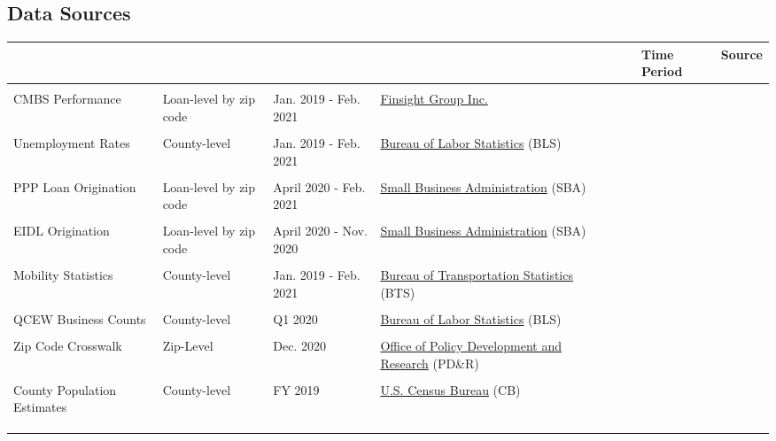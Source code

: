 \documentclass[11pt]{article} %
\begin{document}
\subsection{Data Sources }
\begin{table}[H]
\label{This is a label}
\resizebox{\textwidth}{!} {
\begin{tabular}{llll} \toprule & & & & \vspace{0.5em}
\textbf{\large{}} & \textbf{\large{}} & \textbf{\large{Time Period}} & \textbf{\large{Source}}  
\\\midrule \midrule
 & & & & &  \\
 
 CMBS Performance & Loan-level by zip code & Jan. 2019 - Feb. 2021 & \href{https://finsight.com/}{Finsight Group Inc.} & \\\\

Unemployment Rates & County-level & Jan. 2019 - Feb. 2021 & \href{https://www.bls.gov/}{Bureau of Labor Statistics} (BLS) & \\\\

PPP Loan Origination & Loan-level by zip code & April 2020 - Feb. 2021 \hspace{0.3em} & \href{https://www.sba.gov/}{Small Business Administration} (SBA) & \\\\

EIDL Origination & Loan-level by zip code \hspace{0.3em}  & April 2020 - Nov. 2020 & \href{https://www.sba.gov/}{Small Business Administration} (SBA) & \\\\ 

Mobility Statistics & County-level & Jan. 2019 - Feb. 2021 & \href{https://www.bts.gov/}{Bureau of Transportation Statistics} (BTS) & \\\\ 

QCEW Business Counts & County-level & Q1 2020
& \href{https://www.bls.gov/}{Bureau of Labor Statistics} (BLS) & \\\\

Zip Code Crosswalk & Zip-Level & Dec. 2020 & \href{https://www.huduser.gov/portal/home.html}{Office of Policy Development
and Research} (PD\&R) & \\\\

County Population Estimates \hspace{0.3em}  & County-level & FY 2019 & \href{https://www.census.gov/en.html}{U.S. Census Bureau} (CB) \\\\ \\ 

\hline \hline \\
\end{tabular}}
\end{table}
\end{document}
